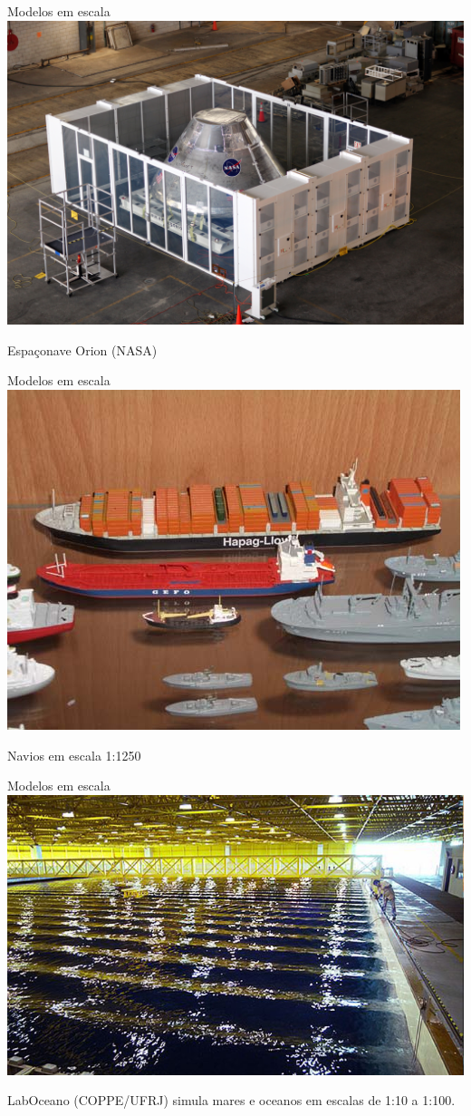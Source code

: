 \documentclass{beamer}
\begin{document}
\begin{frame}{Modelos em escala}
  \centering
  \includegraphics[width=.9\textwidth]{modelos/Orion_engineering_model_in_VAB_clean_room_01}

Espaçonave Orion (NASA)
\end{frame}

\begin{frame}{Modelos em escala}
  \centering
  \includegraphics[width=.8\textwidth]{modelos/Zinnschiffe}

Navios em escala 1:1250
\end{frame}

\begin{frame}{Modelos em escala}
  \centering
  \includegraphics[width=\textwidth]{modelos/laboceano}

LabOceano (COPPE/UFRJ) simula mares e oceanos em escalas de 1:10 a 1:100.
\end{frame}
\end{document}
